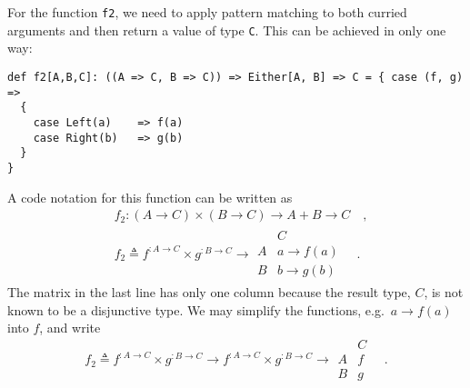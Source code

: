For the function \lstinline!f2!, we need to apply pattern matching
to both curried arguments and then return a value of type \lstinline!C!.
This can be achieved in only one way:
\begin{lstlisting}
def f2[A,B,C]: ((A => C, B => C)) => Either[A, B] => C = { case (f, g) =>
  {
    case Left(a)    => f(a)
    case Right(b)   => g(b)
  }
}
\end{lstlisting}
A code notation for this function can be written as
\begin{align*}
 & f_{2}:\left(A\rightarrow C\right)\times\left(B\rightarrow C\right)\rightarrow A+B\rightarrow C\quad,\\
 & f_{2}\triangleq f^{:A\rightarrow C}\times g^{:B\rightarrow C}\rightarrow\begin{array}{|c||c|}
 & C\\
\hline A & a\rightarrow f(a)\\
B & b\rightarrow g(b)
\end{array}\quad.
\end{align*}
The matrix in the last line has only one column because the result
type, $C$, is not known to be a disjunctive type. We may simplify
the functions, e.g.~$a\rightarrow f(a)$ into $f$, and write
\[
f_{2}\triangleq f^{:A\rightarrow C}\times g^{:B\rightarrow C}\rightarrow f^{:A\rightarrow C}\times g^{:B\rightarrow C}\rightarrow\begin{array}{|c||c|}
 & C\\
\hline A & f\\
B & g
\end{array}\quad.
\]

